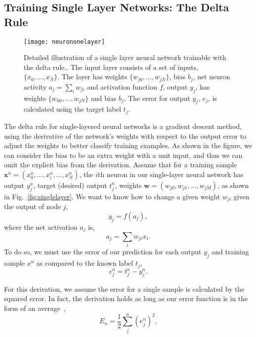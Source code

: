\documentclass[thesis]{subfiles}
\begin{document}
\subsection{Training Single Layer Networks: The Delta Rule}
\label{deltarule}
\begin{figure}[tbp]
\centering
\texttt{[image: neurononelayer]}
\caption[Detailed illustration of a single layer neural network]{Detailed illustration of a single layer neural network trainable with the delta rule.. The input layer consists of a set of inputs, $\{x_{0}, \ldots, x_{N}\}$. The layer has weights $\{w_{j0}, \ldots, w_{jN}\}$, bias $b_j$, net neuron activity $a_j = \sum_i w_{ji}$ and activation function $f$, output $y_j$, has weights $\{w_{k0}, \ldots, w_{jN}\}$ and bias $b_j$. The error for output $y_j$, $e_j$, is calculated using the target label $t_j$.}
\label{fig:neurononelayer}
\end{figure}

The delta rule for single-layered neural networks is a gradient descent method, using the derivative of the network's weights with respect to the output error to adjust the weights to better classify training examples. As shown in the figure, we can consider the bias to be an extra weight with a unit input, and thus we can omit the explicit bias from the derivation. Assume that for a training sample $\mathbf{x}^n = (x^n_0, \ldots, x^n_i, \ldots, x^n_N)$, the $i$th neuron in our single-layer neural network has output $y^n_j$, target (desired) output $t^n_j$, weights $\mathbf{w}=(w_{j0}, w_{j1}, \ldots, w_{jM})$, as shown in Fig.~\ref{fig:singlelayer}. We want to know how to change a given weight $w_{ji}$ given the output of node $j$, 
\begin{equation}
	y_j = f\left( a_j \right),
	\label{eqn:output}
\end{equation}
where the net activation $a_j$ is,
\begin{equation}
	a_j = \sum_i w_{ji} x_{i}.
	\label{eqn:weightsum}
\end{equation}
To do so, we must use the error of our prediction for each output $y_j$ and training sample $x^n$ as compared to the known label $t_j$,
\begin{equation}
    e^n_j = t^n_j - y^n_j.
    \label{eqn:error}
\end{equation}

For this derivation, we assume the error for a single sample is calculated by the squared error. In fact, the derivation holds as long as our error function is in the form of an average~\citep{Bishop1995},
\begin{equation}
    E_n = \frac{1}{2} \sum^n_j \left(e^n_j\right)^2.
    \label{eqn:errorsum}
\end{equation}
\end{document}
